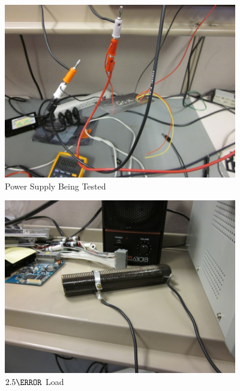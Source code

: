 \begin{figure}[htbp]
\begin{center}
\includegraphics[width=4in]{includes/IMG_0183}
\caption{Power Supply Being Tested}
\end{center}
\end{figure}

\begin{figure}[htbp]
\begin{center}
\includegraphics[width=4in]{includes/IMG_0184}
\caption{$2.5\ohm$ Load}
\end{center}
\end{figure}
